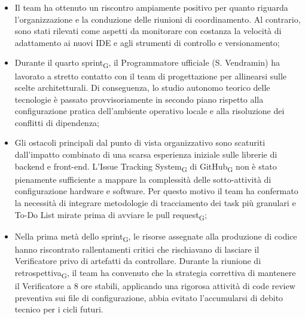 ﻿\documentclass[a4paper, 10pt, colorlinks=true, linkcolor=black, urlcolor=blue, citecolor=blue, hidelinks]{article}
\begin{document}
\begin{itemize}
    \item Il team ha ottenuto un riscontro ampiamente positivo per quanto riguarda l'organizzazione e la conduzione delle riunioni di coordinamento. Al contrario, sono stati rilevati come aspetti da monitorare con costanza la velocità di adattamento ai nuovi IDE e agli strumenti di controllo e versionamento;
    \item Durante il quarto sprint\textsubscript{G}, il Programmatore ufficiale (S. Vendramin) ha lavorato a stretto contatto con il team di progettazione per allinearsi sulle scelte architetturali. Di conseguenza, lo studio autonomo teorico delle tecnologie è passato provvisoriamente in secondo piano rispetto alla configurazione pratica dell'ambiente operativo locale e alla risoluzione dei conflitti di dipendenza;
    \item Gli ostacoli principali dal punto di vista organizzativo sono scaturiti dall'impatto combinato di una scarsa esperienza iniziale sulle librerie di backend e front-end. L'Issue Tracking System\textsubscript{G} di GitHub\textsubscript{G} non è stato pienamente sufficiente a mappare la complessità delle sotto-attività di configurazione hardware e software. Per questo motivo il team ha confermato la necessità di integrare metodologie di tracciamento dei task più granulari e To-Do List mirate prima di avviare le pull request\textsubscript{G};
    \item Nella prima metà dello sprint\textsubscript{G}, le risorse assegnate alla produzione di codice hanno riscontrato rallentamenti critici che rischiavano di lasciare il Verificatore privo di artefatti da controllare. Durante la riunione di retrospettiva\textsubscript{G}, il team ha convenuto che la strategia correttiva di mantenere il Verificatore a 8 ore stabili, applicando una rigorosa attività di code review preventiva sui file di configurazione, abbia evitato l'accumularsi di debito tecnico per i cicli futuri.
\end{itemize}
\end{document}
